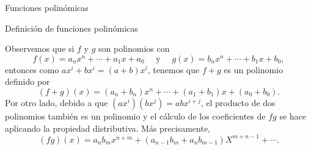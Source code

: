 \begin{chapter}{Funciones polinómicas}
\begin{section}{Definición de funciones polinómicas}
\begin{comment}
            Supongamos que $m \le n$ (el caso $n \le m$ es similar), entonces definiendo $b_k=0$ para $m < k \le n$, tenemos que
            \begin{equation*}
            f(x) = b_nx^n + b_{n-1}x^{n-1}+\cdots + b_1x +b_0.
            \end{equation*}
            Por lo tanto si 
            \begin{equation}\label{eq-h-igual-f-g}
                h(x) = (a_n- b_n)x^n + (a_{n-1}-b_{n-1})x^{n-1}+\cdots + (a_{1}-b_{1})x +(a_{0}-b_{0}), 
            \end{equation}
            tenemos  que $h(x)= f(x)-f(x)=0$,  es un polinomio que admite infinitas raíces. 
            Supongamos  que algún coeficiente de la expresión \eqref{eq-h-igual-f-g} de $h$ sea no nulo. Sea $k$  el máximo coeficiente de la expresión \eqref{eq-h-igual-f-g} no nulo. Por el teorema   \ref{th-pol-raiz}, $h$ no  puede tener más de $k$ raíces, absurdo pues hemos dicho que tenía infinitas. El absurdo vino de suponer que algún $a_i-b_i$ era no nulo. Por lo tanto $a_i -b_i=0$ para $0 \le i \le n$,  es decir $a_i=b_i$ para $1 \le i \le n$. 
            
            
        \end{proof}
    
        Este corolario nos dice que la escritura de un polinomio $f$ como 
        \begin{equation*}
        f(x) = a_nx^n + a_{n-1}x^{n-1}+\cdots + a_1x +a_0,
        \end{equation*}
        con $a_n \ne 0$, es única. Diremos entonces que $n$ es el  \textit{grado} de $f$ y lo denotaremos $\operatorname{gr}(f)=n$. En  el caso del polinomio 0, el grado no está definido y se usa la convención $\operatorname{gr}(0)=-\infty$. 
        
        Diremos también que  $a_0,\ldots,a_n$ son los \textit{coeficientes} de $f$, $a_0$ es el \textit{término constante} de $f$ y $a_n$  el \textit{coeficiente principal.} 
    \end{comment}
        Observemos que si $f$ y $g$ son polinomios con   
        \begin{equation*}
        f(x) = a_nx^n + \cdots + a_1x +a_0 \quad\text{ y } \quad g(x) = b_nx^n +\cdots + b_1x +b_0,
        \end{equation*}
        entonces como $ax^i + b x^i = (a+b)x^i$, tenemos que $f+g$ es un polinomio definido por 
        \begin{equation*}
        (f + g)(x) = (a_n+b_n)x^n + \cdots + (a_1+b_1)x +(a_0+b_0).
        \end{equation*}
        Por otro  lado,  debido  a que $(ax^i)(bx^j) = abx^{i+j}$, el producto de dos polinomios también es un polinomio y el cálculo de los coeficientes de $fg$  se hace aplicando la propiedad distributiva. Más precisamente,
        \begin{equation*}
            (fg)(x) = a_nb_m x^{n+m} + (a_{n-1}b_m + a_nb_{m-1})X^{m+n-1} + \cdots. 
         \end{equation*}
        

\end{section}
\end{chapter}

